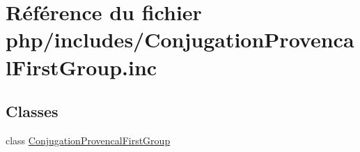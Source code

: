 \hypertarget{_conjugation_provencal_first_group_8inc}{}\section{Référence du fichier php/includes/\+Conjugation\+Provencal\+First\+Group.inc}
\label{_conjugation_provencal_first_group_8inc}
\subsection*{Classes}
\begin{DoxyCompactItemize}
\item 
class \hyperlink{class_conjugation_provencal_first_group}{Conjugation\+Provencal\+First\+Group}
\end{DoxyCompactItemize}
